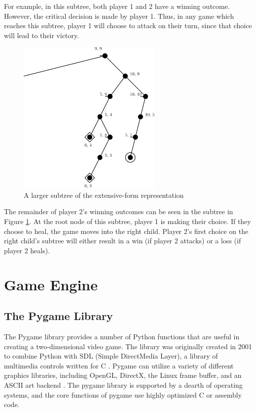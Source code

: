 For example, in this subtree, both player 1 and 2 have a winning outcome. However, the critical decision is made by player 1. Thus, in any game which reaches this subtree, player 1 will choose to attack on their turn, since that choice will lead to their victory.\\

\begin{figure}[H]
  \centering
  \includegraphics[width=7cm]{figures/GameSubtree2.png}
  \caption{A larger subtree of the extensive-form representation}
  \label{fig:gameSubtree2}
\end{figure}

The remainder of player 2's winning outcomes can be seen in the subtree in Figure \ref{fig:gameSubtree2}. At the root node of this subtree, player 1 is making their choice. If they choose to heal, the game moves into the right child. Player 2's first choice on the right child's subtree will either result in a win (if player 2 attacks) or a loss (if player 2 heals).

\section{Game Engine}
\subsection{The Pygame Library}
The Pygame library provides a number of Python functions that are useful in creating a two-dimensional video game. The library was originally created in 2001 to combine Python with SDL (Simple DirectMedia Layer), a library of multimedia controls written for C \cite{shinners}. Pygame can utilize a variety of different graphics libraries, including OpenGL, DirectX, the Linux frame buffer, and an ASCII art backend \cite{shinners}. The pygame library is supported by a dearth of operating systems, and the core functions of pygame use highly optimized C or assembly code.\\

